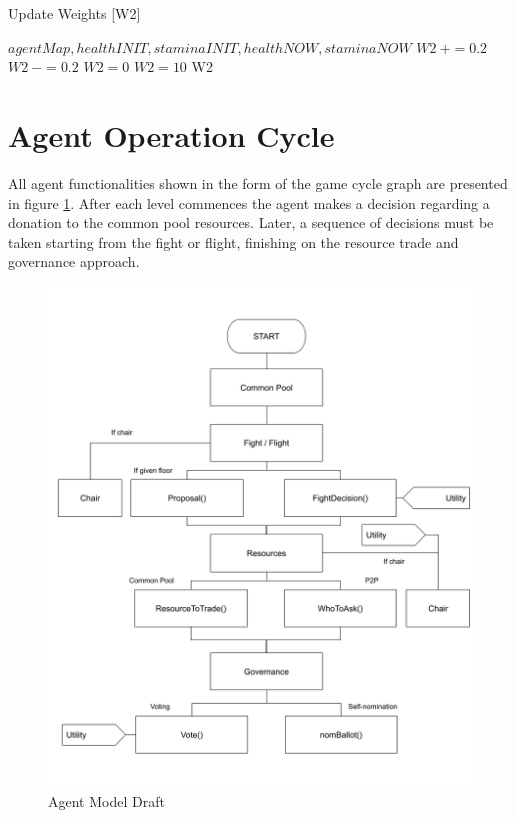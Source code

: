 \begin{algorithm}[ht]
\caption{Update Weights [W2]}\label{alg:7}
\begin{algorithmic} 
\scriptsize
\Require $agentMap, healthINIT, staminaINIT,healthNOW, staminaNOW$
\State $W2~+= 0.2$
\Else
\State $W2~-= 0.2$
\EndIf
{}
\State $W2 = 0$
\EndIf
{}
\State $W2 = 10$
\EndIf
\State
\Return W2
\end{algorithmic}
\end{algorithm}


\section{Agent Operation Cycle}

All agent functionalities shown in the form of the game cycle graph are presented in figure \ref{fig:agent_model}. After each level commences the agent makes a decision regarding a donation to the common pool resources. Later, a sequence of decisions must be taken starting from the fight or flight, finishing on the resource trade and governance approach.

\begin{figure}[htb]
    \centering
    \includegraphics[scale=0.35]{006_team_3_agent_design/FIGS/diagram.png}
    \caption{Agent Model Draft}
    \label{fig:agent_model}
\end{figure}




